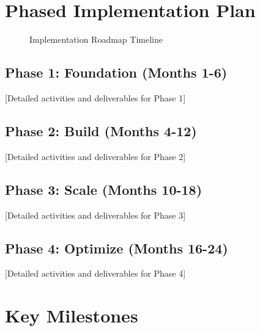 \documentclass[11pt,letterpaper]{report}
\begin{document}
\section{Phased Implementation Plan}


\begin{figure}[htbp]
\centering
\caption{Implementation Roadmap Timeline}
\label{fig:implementation}
\end{figure}

\subsection{Phase 1: Foundation (Months 1-6)}
[Detailed activities and deliverables for Phase 1]

\subsection{Phase 2: Build (Months 4-12)}
[Detailed activities and deliverables for Phase 2]

\subsection{Phase 3: Scale (Months 10-18)}
[Detailed activities and deliverables for Phase 3]

\subsection{Phase 4: Optimize (Months 16-24)}
[Detailed activities and deliverables for Phase 4]

\section{Key Milestones}

\end{document}
